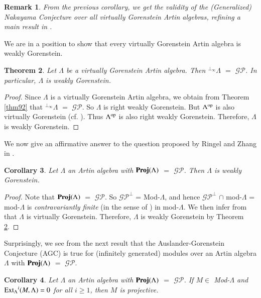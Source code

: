 \documentclass[11pt,a4paper]{article}
\newtheorem{thm}{Theorem}[section]
\newtheorem{cor}[thm]{Corollary}
\newtheorem{rem}[thm]{Remark}
\begin{document}
\begin{rem}\label{rem29}  {\rm
From the previous corollary,  we get    the validity
of the (Generalized) Nakayama Conjecture over all  virtually
Gorenstein Artin algebras, refining a main result in \cite[Theorem 1.2]{ch1}.}\end{rem}

We are in a position to show that every virtually Gorenstein  Artin algebra is weakly Gorenstein.

 \begin{thm}\label{thm101} Let   $\Lambda$  be  a virtually Gorenstein  Artin algebra. Then  $^{\perp_{\infty}}{\Lambda} $ $=$  $\mathscr{GP}$.
 In particular,  $\Lambda$ is weakly Gorenstein.
 \end{thm}

 \begin{proof} Since $\Lambda$ is a virtually Gorenstein  Artin algebra, we obtain from Theorem \ref{thm92} that $^{\perp_{\infty}}{\Lambda} $ $=$  $\mathscr{GP}$.
 So $\Lambda$ is right weakly Gorenstein. But $\Lambda^{{\rm op}}$ is also   virtually Gorenstein (cf. \cite[Theorem 8.7]{bel}).
 Thus $\Lambda^{{\rm op}}$ is also right weakly Gorenstein. Therefore,  $\Lambda$ is weakly Gorenstein.\end{proof}

 We now give an affirmative answer to the question proposed by   Ringel and  Zhang in \cite[Question 9.2]{rz1}.
 \begin{cor}\label{cor101} Let   $\Lambda$  an  Artin algebra with ${\bf Proj}(\Lambda)$ $=$  $\mathscr{GP}$. Then   $\Lambda$ is weakly Gorenstein.
 \end{cor}

  \begin{proof} Note that  ${\bf Proj}(\Lambda)$ $=$  $\mathscr{GP}$. So $\mathscr{GP}^\perp$  = Mod-$\Lambda$, and hence $\mathscr{GP}^\perp $ $\cap$ mod-$\Lambda$  = mod-$\Lambda$
  is {\it contravariantly  finite} (in the sense of \cite{ar1}) in mod-$\Lambda$.
    We then infer from \cite[Theorem 8.2(viii)]{bel} that
  $\Lambda$ is  virtually Gorenstein.    Therefore,  $\Lambda$ is weakly Gorenstein by Theorem \ref{thm101}.\end{proof}

Surprisingly, we see from the next result that the  Auslander-Gorenstein Conjecture (AGC) is true  for (infinitely generated) modules over an Artin algebra  $\Lambda$  with ${\bf Proj}(\Lambda)$ $=$  $\mathscr{GP}$.
 \begin{cor}\label{cor201} Let   $\Lambda$  an  Artin algebra with ${\bf Proj}(\Lambda)$ $=$  $\mathscr{GP}$. If $M \in$  {\rm Mod}-$\Lambda$   and  ${\rm Ext_{\Lambda}}^{i}(M, \Lambda)=0$ for all  $i \geq 1$, then $M$ is projective.
 \end{cor}
\end{document}
